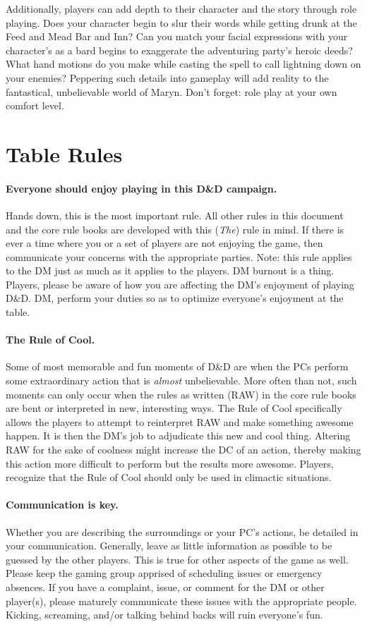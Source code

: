 \documentclass[12pt]{article}
\begin{document}
\textsf{Additionally, players can add depth to their character and the story through role playing. Does your character begin to slur their words while getting drunk at the Feed and Mead Bar and Inn? Can you match your facial expressions with your character's as a bard begins to exaggerate the adventuring party's heroic deeds? What hand motions do you make while casting the spell to call lightning down on your enemies? Peppering such details into gameplay will add reality to the fantastical, unbelievable world of Maryn. Don't forget: role play at your own comfort level.}

\section{Table Rules}
\paragraph{Everyone should enjoy playing in this D\&D campaign.} \textsf{Hands down, this is the most important rule. All other rules in this document and the core rule books are developed with this (\textit{The}) rule in mind. If there is ever a time where you or a set of players are not enjoying the game, then communicate your concerns with the appropriate parties. Note: this rule applies to the DM just as much as it applies to the players. DM burnout is a thing. Players, please be aware of how you are affecting the DM's enjoyment of playing D\&D. DM, perform your duties so as to optimize everyone's enjoyment at the table.} 

\paragraph{The Rule of Cool.}
\textsf{Some of most memorable and fun moments of D\&D are when the PCs perform some extraordinary action that is \textit{almost} unbelievable. More often than not, such moments can only occur when the rules as written (RAW) in the core rule books are bent or interpreted in new, interesting ways. The Rule of Cool specifically allows the players to attempt to reinterpret RAW and make something awesome happen. It is then the DM's job to adjudicate this new and cool thing. Altering RAW for the sake of coolness might increase the DC of an action, thereby making this action more difficult to perform but the results more awesome. Players, recognize that the Rule of Cool should only be used in climactic situations.}

\paragraph{Communication is key.} 
\textsf{Whether you are describing the surroundings or your PC's actions, be detailed in your communication. Generally, leave as little information as possible to be guessed by the other players. This is true for other aspects of the game as well. Please keep the gaming group apprised of scheduling issues or emergency absences. If you have a complaint, issue, or comment for the DM or other player(s), please maturely communicate these issues with the appropriate people. Kicking, screaming, and/or talking behind backs will ruin everyone's fun.}
\end{document}
